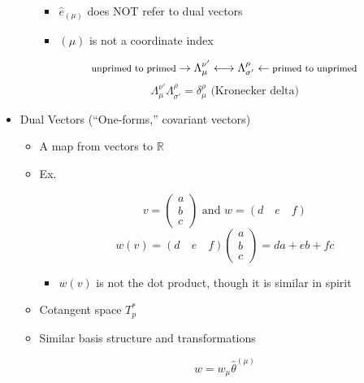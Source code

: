 \begin{itemize}
\begin{itemize}
        \begin{itemize}

          \item $\hat{e}_{(\mu)}$ does NOT refer to dual vectors

          \item $(\mu)$ is not a coordinate index

        \end{itemize}

        $$\text{\footnotesize unprimed to primed}\to\Lambda^{\nu'}_{\mu}\longleftrightarrow\Lambda^{\rho}_{\sigma'}\leftarrow\text{\footnotesize primed to unprimed}$$
        $$\Lambda^{\nu'}_{\mu}\Lambda^{\rho}_{\sigma'}=\delta_{\mu}^{\rho}\text{ (Kronecker delta)}$$

    \end{itemize}

  \item Dual Vectors (``One-forms,'' covariant vectors)

    \begin{itemize}

      \item A map from vectors to $\mathbb{R}$

      \item Ex.

        $$v=\left( \begin{array}{c}a\\b\\c\end{array} \right)\text{ and }w=(d\quad e\quad f)$$
        $$w(v)=(d\quad e\quad f)\left(\begin{array}{c}a\\b\\c\end{array}\right)=da+eb+fc$$

        \begin{itemize}

          \item $w(v)$ is not the dot product, though it is similar in spirit

        \end{itemize}

      \item Cotangent space $T_p^{*}$

      \item Similar basis structure and transformations

        $$w=w_{\mu}\hat{\theta}^{(\mu)}$$


\end{itemize}
\end{itemize}
